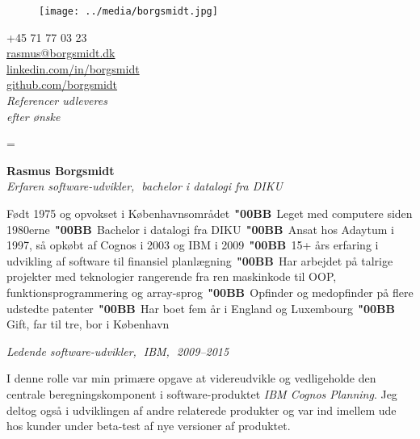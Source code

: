\documentclass[a4paper,10pt,final]{memoir}
\DeclareRobustCommand{\spacedallcaps}[1]{\MakeTextUppercase{\allcapsspacing{#1}}}%
\newcommand{\Sep}{\vspace{1.5em}}
\newcommand{\SmallSep}{\vspace{0.5em}}
\newcommand{\Dot}{\mbox{\color{SpotColor}$\,\;$\textbf{\char"00BB}$\,\;$}}
\newenvironment{inlinepar}[1]
	{\ignorespaces{\lowsmallcapsspacing{\textbf{#1}}}}
	{\ignorespacesafterend}
\newcommand{\CVSection}[1]
	{\textbf{\spacedallcaps{#1}}\par
	\SmallSep\normalsize\normalfont}
\newcommand{\CVItem}[1]
	{\textit{\color{SpotColor} #1}}
\begin{document}
\begin{figure}
	\hfill
	\texttt{[image: ../media/borgsmidt.jpg]}
	\vspace{-7cm}
\end{figure}

\begin{flushright}\footnotesize
  +45 71 77 03 23\\
  \href{mailto:rasmus@borgsmidt.dk}{rasmus@borgsmidt.dk}\\
  \href{http://dk.linkedin.com/in/borgsmidt}{linkedin.com/in/borgsmidt}\\
  \href{https://github.com/borgsmidt}{github.com/borgsmidt}\\[12pt]
  {\em Referencer udleveres\\ efter ønske}
\end{flushright}\normalsize
\framebreak

\font%
\font%
\font=\font%

\huge{\textbf{Rasmus Borgsmidt}} \\
\Large{\color{SpotColor}\em Erfaren software-udvikler,$\;$ bachelor i datalogi fra DIKU}

\normalsize\normalfont

\Sep\begin{inlinepar}{kort om mig}
  Født 1975 og opvokset i Københavnsområdet\Dot Leget med computere siden
  1980\-erne\Dot Bachelor i datalogi fra DIKU\Dot Ansat hos Adaytum i 1997, så
  opkøbt af \mbox{Cognos} i 2003 og IBM i 2009\Dot 15+ års erfaring i udvikling
  af software til finansiel planlægning\Dot Har arbejdet på talrige projekter
  med tekno\-logier rangerende fra ren maskinkode til OOP,
  funktionsprogrammering og array-sprog\Dot Opfinder og medopfinder på flere
  udstedte patenter\Dot Har boet fem år i England og Luxembourg\Dot Gift, far
  til tre, bor i København
\end{inlinepar}

\Sep\CVSection{erfaring}

\CVItem{Ledende software-udvikler,$\;$ IBM,$\;$ 2009--2015}

I denne rolle var min primære opgave at videreudvikle og vedligeholde den
centrale beregningskomponent i software-produktet {\em IBM Cognos Planning}. Jeg
deltog også i udviklingen af andre relaterede produkter og var ind imellem ude
hos kunder under beta-test af nye versioner af produktet.
\end{document}
